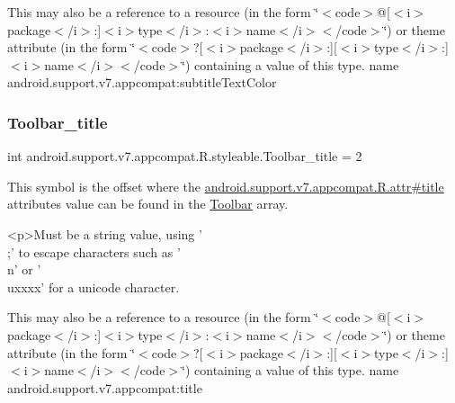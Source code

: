 This may also be a reference to a resource (in the form \char`\"{}$<$code$>$@\mbox{[}$<$i$>$package$<$/i$>$\+:\mbox{]}$<$i$>$type$<$/i$>$\+:$<$i$>$name$<$/i$>$$<$/code$>$\char`\"{}) or theme attribute (in the form \char`\"{}$<$code$>$?\mbox{[}$<$i$>$package$<$/i$>$\+:\mbox{]}\mbox{[}$<$i$>$type$<$/i$>$\+:\mbox{]}$<$i$>$name$<$/i$>$$<$/code$>$\char`\"{}) containing a value of this type.  name android.\+support.\+v7.\+appcompat\+:subtitle\+Text\+Color \mbox{\label{classandroid_1_1support_1_1v7_1_1appcompat_1_1R_1_1styleable_ae82c877334b3ecc680d267e91832e912}} 
\subsubsection{\texorpdfstring{Toolbar\+\_\+title}{Toolbar\_title}}
{\footnotesize\ttfamily int android.\+support.\+v7.\+appcompat.\+R.\+styleable.\+Toolbar\+\_\+title = 2\hspace{0.3cm}{\ttfamily [static]}}

This symbol is the offset where the \hyperlink{classandroid_1_1support_1_1v7_1_1appcompat_1_1R_1_1attr_a030356582065eaa1afdf1e3e37509b4c}{android.\+support.\+v7.\+appcompat.\+R.\+attr\#title} attribute\textquotesingle{}s value can be found in the \hyperlink{classandroid_1_1support_1_1v7_1_1appcompat_1_1R_1_1styleable_a2daba9587ef9f700f2d54cf13435cb32}{Toolbar} array.

\begin{DoxyVerb}      <p>Must be a string value, using '\\;' to escape characters such as '\\n' or '\\uxxxx' for a unicode character.
\end{DoxyVerb}
 

This may also be a reference to a resource (in the form \char`\"{}$<$code$>$@\mbox{[}$<$i$>$package$<$/i$>$\+:\mbox{]}$<$i$>$type$<$/i$>$\+:$<$i$>$name$<$/i$>$$<$/code$>$\char`\"{}) or theme attribute (in the form \char`\"{}$<$code$>$?\mbox{[}$<$i$>$package$<$/i$>$\+:\mbox{]}\mbox{[}$<$i$>$type$<$/i$>$\+:\mbox{]}$<$i$>$name$<$/i$>$$<$/code$>$\char`\"{}) containing a value of this type.  name android.\+support.\+v7.\+appcompat\+:title \mbox{\label{classandroid_1_1support_1_1v7_1_1appcompat_1_1R_1_1styleable_a9412dd4f8671bfd3fbc475b6bb4b9686}} 
